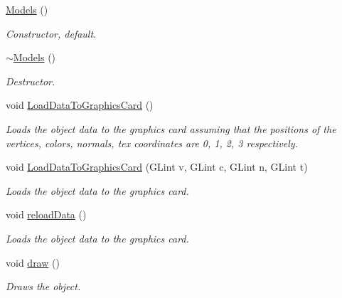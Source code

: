 \begin{DoxyCompactItemize}
\item 
\mbox{\label{class_models_a3d822d79de8a3a3e4a89b48231110cec}} 
\hyperlink{class_models_a3d822d79de8a3a3e4a89b48231110cec}{Models} ()
\begin{DoxyCompactList}\small\item\em Constructor, default. \end{DoxyCompactList}\item 
\hyperlink{class_models_aef02b88508c7cf66170381982e57ce3e}{$\sim$\+Models} ()
\begin{DoxyCompactList}\small\item\em Destructor. \end{DoxyCompactList}\item 
\mbox{\label{class_models_a37639ded69e396965605f32b7a977166}} 
void \hyperlink{class_models_a37639ded69e396965605f32b7a977166}{Load\+Data\+To\+Graphics\+Card} ()
\begin{DoxyCompactList}\small\item\em Loads the object data to the graphics card assuming that the positions of the vertices, colors, normals, tex coordinates are 0, 1, 2, 3 respectively. \end{DoxyCompactList}\item 
void \hyperlink{class_models_a90cb29f7c47019e536c3a66874f8c24b}{Load\+Data\+To\+Graphics\+Card} (G\+Lint v, G\+Lint c, G\+Lint n, G\+Lint t)
\begin{DoxyCompactList}\small\item\em Loads the object data to the graphics card. \end{DoxyCompactList}\item 
\mbox{\label{class_models_a9919b08422ec91e79a3084ce7e565429}} 
void \hyperlink{class_models_a9919b08422ec91e79a3084ce7e565429}{reload\+Data} ()
\begin{DoxyCompactList}\small\item\em Loads the object data to the graphics card. \end{DoxyCompactList}\item 
\mbox{\label{class_models_a302e2de33467a2cdb283c9b34ced49b6}} 
void \hyperlink{class_models_a302e2de33467a2cdb283c9b34ced49b6}{draw} ()
\begin{DoxyCompactList}\small\item\em Draws the object. \end{DoxyCompactList}\item 

\end{DoxyCompactItemize}
